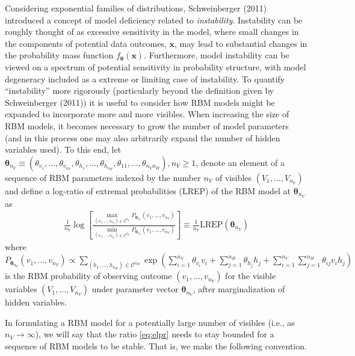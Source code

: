 \documentclass[AMS,STIX1COL]{WileyNJD-v2}
\newcommand{\nv}{{n_{\scriptscriptstyle V}}}
\newcommand{\nh}{{n_{\scriptscriptstyle H}}}
\begin{document}
Considering exponential families of distributions, Schweinberger (2011)
introduced a concept of model deficiency related to \emph{instability}.
Instability can be roughly thought of as excessive sensitivity in the
model, where small changes in the components of potential data outcomes,
\(\boldsymbol x\), may lead to substantial changes in the probability
mass function \(f_{\boldsymbol \theta}(\boldsymbol x)\). Furthermore,
model instability can be viewed on a spectrum of potential sensitivity
in probability structure, with model degeneracy included as a extreme or
limiting case of instability. To quantify ``instability'' more
rigorously (particularly beyond the definition given by Schweinberger
(2011)) it is useful to consider how RBM models might be expanded to
incorporate more and more visibles. When increasing the size of RBM
models, it becomes necessary to grow the number of model parameters (and
in this process one may also arbitrarily expand the number of hidden
variables used). To this end, let
\(\boldsymbol \theta_{\nv} \equiv (\theta_{v_1}, \dots, \theta_{v_\nv}, \theta_{h_1}, \dots, \theta_{h_\nh}, \theta_{11}, \dots, \theta_{\nv \nh}), \nv \ge 1\),
denote an element of a sequence of RBM parameters indexed by the number
\(\nv\) of visibles \((V_1, \dots, V_\nv)\) and define a log-ratio of
extremal probabilities (LREP) of the RBM model at
\(\boldsymbol \theta_{\nv}\) as \begin{align}
\frac{1}{\nv} \log \left[\frac{\max\limits_{(v_1, \dots, v_\nv) \in \mathcal{C}^\nv}P_{\boldsymbol \theta_\nv}(v_1, \dots, v_\nv)}{\min\limits_{(v_1, \dots, v_\nv) \in \mathcal{C}^\nv}P_{\boldsymbol \theta_\nv}(v_1, \dots, v_\nv)}\right] \equiv \frac{1}{\nv} \text{LREP}(\boldsymbol \theta_\nv) \label{eq:elpr}
\end{align} where
\(P_{\boldsymbol \theta_\nv}(v_1, \dots, v_\nv) \propto \sum_{(h_1, \dots, h_\nh) \in \mathcal{C}^\nh}\exp\left(\sum_{i = 1}^\nv \theta_{v_i} v_i + \sum_{j = 1}^\nh \theta_{h_j} h_j + \sum_{i = 1}^\nv \sum_{j = 1}^\nh \theta_{ij} v_i h_j\right)\)
is the RBM probability of observing outcome \((v_1, \dots, v_\nv)\) for
the visible variables \((V_1, \dots, V_\nv)\) under parameter vector
\(\boldsymbol \theta_\nv\), after marginalization of hidden variables.

In formulating a RBM model for a potentially large number of visibles
(i.e., as \(\nv \rightarrow \infty\)), we will say that the ratio
\eqref{eq:elpr} needs to stay bounded for a sequence of RBM models to be
stable. That is, we make the following convention.
\end{document}
